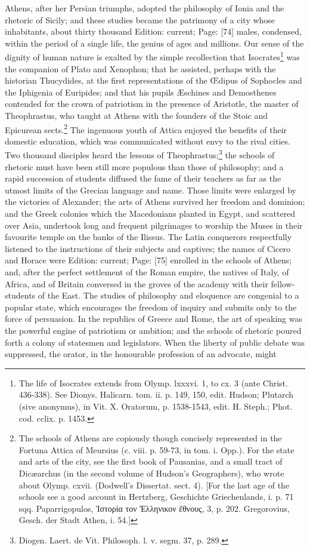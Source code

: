 Athens, after her Persian triumphs, adopted the philosophy of Ionia and the rhetoric of Sicily; and these studies became the patrimony of a city whose inhabitants, about thirty thousand Edition: current; Page: [74] males, condensed, within the period of a single life, the genius of ages and millions. Our sense of the dignity of human nature is exalted by the simple recollection that Isocrates\footnote{The life of Isocrates extends from Olymp. lxxxvi. 1, to cx. 3 (ante Christ. 436-338). See Dionys. Halicarn. tom. ii. p. 149, 150, edit. Hudson; Plutarch (sive anonymus), in Vit. X. Oratorum, p. 1538-1543, edit. H. Steph.; Phot. cod. cclix. p. 1453.} was the companion of Plato and Xenophon; that he assisted, perhaps with the historian Thucydides, at the first representations of the Œdipus of Sophocles and the Iphigenia of Euripides; and that his pupils Æschines and Demosthenes contended for the crown of patriotism in the presence of Aristotle, the master of Theophrastus, who taught at Athens with the founders of the Stoic and Epicurean sects.\footnote{The schools of Athens are copiously though concisely represented in the Fortuna Attica of Meursius (c. viii. p. 59-73, in tom. i. Opp.). For the state and arts of the city, see the first book of Pausanias, and a small tract of Dicæarchus (in the second volume of Hudson\texthebrew{}’s Geographers), who wrote about Olymp. cxvii. (Dodwell\texthebrew{}’s Dissertat. sect. 4). [For the last age of the schools see a good account in Hertzberg, Geschichte Griechenlands, i. p. 71 sqq. Paparrigopulos, \textgreek{\texthebrew{Ἱ}στορία τον \texthebrew{Ἐ}λληνικον \texthebrew{ἔ}θνους}, 3, p. 202. Gregorovius, Gesch. der Stadt Athen, i. 54.]} The ingenuous youth of Attica enjoyed the benefits of their domestic education, which was communicated without envy to the rival cities. Two thousand disciples heard the lessons of Theophrastus;\footnote{Diogen. Laert. de Vit. Philosoph. l. v. segm. 37, p. 289.} the schools of rhetoric must have been still more populous than those of philosophy; and a rapid succession of students diffused the fame of their teachers as far as the utmost limits of the Grecian language and name. Those limits were enlarged by the victories of Alexander; the arts of Athens survived her freedom and dominion; and the Greek colonies which the Macedonians planted in Egypt, and scattered over Asia, undertook long and frequent pilgrimages to worship the Muses in their favourite temple on the banks of the Ilissus. The Latin conquerors respectfully listened to the instructions of their subjects and captives; the names of Cicero and Horace were Edition: current; Page: [75] enrolled in the schools of Athens; and, after the perfect settlement of the Roman empire, the natives of Italy, of Africa, and of Britain conversed in the groves of the academy with their fellow-students of the East. The studies of philosophy and eloquence are congenial to a popular state, which encourages the freedom of inquiry and submits only to the force of persuasion. In the republics of Greece and Rome, the art of speaking was the powerful engine of patriotism or ambition; and the schools of rhetoric poured forth a colony of statesmen and legislators. When the liberty of public debate was suppressed, the orator, in the honourable profession of an advocate, might 